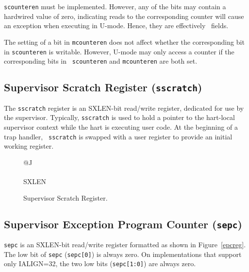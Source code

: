 {\tt scounteren} must be implemented.  However, any of the bits may contain
a hardwired value of zero, indicating reads to the corresponding counter will
cause an exception when executing in U-mode.
Hence, they are effectively \warl\ fields.

\begin{commentary}
The setting of a bit in {\tt mcounteren} does not affect whether the
corresponding bit in {\tt scounteren} is writable.
However, U-mode may only access a counter if the corresponding bits in {\tt
scounteren} and {\tt mcounteren} are both set.
\end{commentary}

\subsection{Supervisor Scratch Register ({\tt sscratch})}

The {\tt sscratch} register is an SXLEN-bit read/write register,
dedicated for use by the supervisor.  Typically, {\tt sscratch} is
used to hold a pointer to the hart-local supervisor context while the
hart is executing user code.  At the beginning of a trap handler, {\tt
  sscratch} is swapped with a user register to provide an initial
working register.

\begin{figure}[h!]
{\footnotesize
\begin{center}
\begin{tabular}{@{}J}
 \\
\hline
{} \\
\hline
SXLEN \\
\end{tabular}
\end{center}
}
\vspace{-0.1in}
\caption{Supervisor Scratch Register.}
\label{kregs}
\end{figure}

\subsection{Supervisor Exception Program Counter ({\tt sepc})}

{\tt sepc} is an SXLEN-bit read/write register formatted as shown in
Figure~\ref{epcreg}.  The low bit of {\tt sepc} ({\tt sepc[0]}) is
always zero.  On implementations that support only IALIGN=32, the two low bits
({\tt sepc[1:0]}) are always zero.

